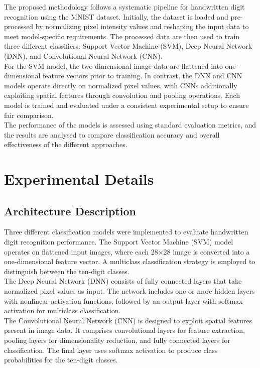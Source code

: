 \documentclass[11pt,a4paper]{article}
\begin{document}
	The proposed methodology follows a systematic pipeline for handwritten digit recognition using the MNIST dataset. Initially, the dataset is loaded and pre-processed by normalizing pixel intensity values and reshaping the input data to meet model-specific requirements. The processed data are then used to train three different classifiers: Support Vector Machine (SVM), Deep Neural Network (DNN), and Convolutional Neural Network (CNN). \\
	For the SVM model, the two-dimensional image data are flattened into one-dimensional feature vectors prior to training. In contrast, the DNN and CNN models operate directly on normalized pixel values, with CNNs additionally exploiting spatial features through convolution and pooling operations. Each model is trained and evaluated under a consistent experimental setup to ensure fair comparison. \\
	The performance of the models is assessed using standard evaluation metrics, and the results are analysed to compare classification accuracy and overall effectiveness of the different approaches.
	
	\section{Experimental Details}
	
	\subsection{Architecture Description}
	
	Three different classification models were implemented to evaluate handwritten digit recognition performance. The Support Vector Machine (SVM) model operates on flattened input images, where each 28×28 image is converted into a one-dimensional feature vector. A multiclass classification strategy is employed to distinguish between the ten-digit classes. \\
	The Deep Neural Network (DNN) consists of fully connected layers that take normalized pixel values as input. The network includes one or more hidden layers with nonlinear activation functions, followed by an output layer with softmax activation for multiclass classification. \\
	The Convolutional Neural Network (CNN) is designed to exploit spatial features present in image data. It comprises convolutional layers for feature extraction, pooling layers for dimensionality reduction, and fully connected layers for classification. The final layer uses softmax activation to produce class probabilities for the ten-digit classes.
	
\end{document}
